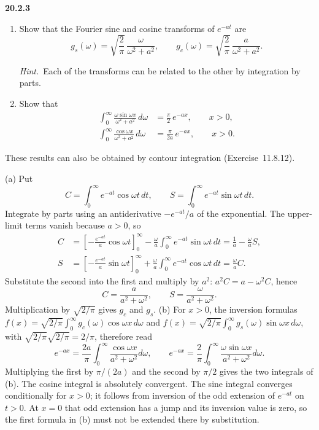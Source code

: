 \par\bigskip
\noindent\textbf{20.2.3}
\begin{enumerate}
\item[(a)] Show that the Fourier sine and cosine transforms of
$e^{-at}$ are
\[
g_{s}(\omega)=\sqrt{\frac{2}{\pi}}\,\frac{\omega}{\omega^{2}+a^{2}},
\qquad
g_{c}(\omega)=\sqrt{\frac{2}{\pi}}\,\frac{a}{\omega^{2}+a^{2}}.
\]
\par\emph{Hint.}~Each of the transforms can be related to the
other by integration by parts.
\item[(b)] Show that
\begin{align*}
\int_{0}^{\infty}\frac{\omega\sin\omega x}{\omega^{2}+a^{2}}\,d\omega
&=\frac{\pi}{2}\,e^{-ax},\qquad x>0,\\
\int_{0}^{\infty}\frac{\cos\omega x}{\omega^{2}+a^{2}}\,d\omega
&=\frac{\pi}{2a}\,e^{-ax},\qquad x>0.
\end{align*}
\end{enumerate}
These results can also be obtained by contour integration
(Exercise~11.8.12).
\par{}
\solution
{}

(a) Put
\[
C=\int_0^\infty e^{-at}\cos\omega t\,dt,\qquad
S=\int_0^\infty e^{-at}\sin\omega t\,dt.
\]
Integrate by parts using an antiderivative $-e^{-at}/a$ of the
exponential. The upper-limit terms vanish because $a>0$, so
\begin{align*}
C&=\left[-\frac{e^{-at}}a\cos\omega t\right]_0^\infty
-\frac\omega a\int_0^\infty e^{-at}\sin\omega t\,dt
=\frac1a-\frac\omega aS,\\
S&=\left[-\frac{e^{-at}}a\sin\omega t\right]_0^\infty
+\frac\omega a\int_0^\infty e^{-at}\cos\omega t\,dt
=\frac\omega aC.
\end{align*}
Substitute the second into the first and multiply by $a^2$:
$a^2C=a-\omega^2C$, hence
\[
C=\frac a{a^2+\omega^2},\qquad
S=\frac\omega{a^2+\omega^2}.
\]
Multiplication by $\sqrt{2/\pi}$ gives $g_c$ and $g_s$.
(b) For $x>0$, the inversion formulas
$f(x)=\sqrt{2/\pi}\int_0^\infty g_c(\omega)\cos\omega x\,d\omega$
and $f(x)=\sqrt{2/\pi}\int_0^\infty g_s(\omega)\sin\omega x\,d\omega$,
with $\sqrt{2/\pi}\sqrt{2/\pi}=2/\pi$, therefore read
\[
e^{-ax}=\frac{2a}{\pi}\int_0^\infty
\frac{\cos\omega x}{a^2+\omega^2}d\omega,
\qquad
e^{-ax}=\frac2\pi\int_0^\infty
\frac{\omega\sin\omega x}{a^2+\omega^2}d\omega.
\]
Multiplying the first by $\pi/(2a)$ and the second by $\pi/2$
gives the two integrals of (b).
The cosine integral is absolutely convergent. The sine integral
converges conditionally for $x>0$; it follows from inversion of
the odd extension of $e^{-at}$ on $t>0$. At $x=0$ that odd
extension has a jump and its inversion value is zero, so the
first formula in (b) must not be extended there by substitution.

